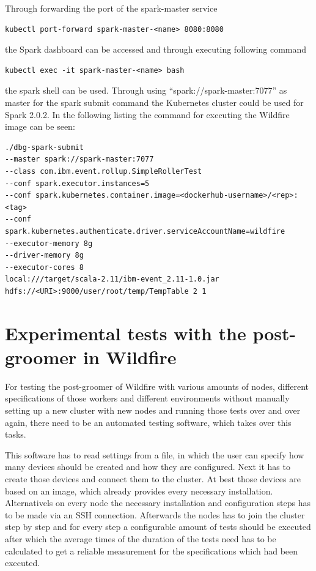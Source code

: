 Through forwarding the port of the spark-master service 
\begin{lstlisting}[caption={Forward spark-master service pod},captionpos=b]
kubectl port-forward spark-master-<name> 8080:8080
\end{lstlisting}
the Spark dashboard can be accessed and through executing following command
\begin{lstlisting}[caption={Access spark shell},captionpos=b]
kubectl exec -it spark-master-<name> bash
\end{lstlisting}
the spark shell can be used. Through using ``spark://spark-master:7077'' as master for the spark submit command the Kubernetes cluster could be used for Spark 2.0.2. In the following listing the command for executing the Wildfire image can be seen:
\begin{lstlisting}[caption={Execute Wildfire image with Kubernetes},captionpos=b]
./dbg-spark-submit 
--master spark://spark-master:7077 
--class com.ibm.event.rollup.SimpleRollerTest 
--conf spark.executor.instances=5 
--conf spark.kubernetes.container.image=<dockerhub-username>/<rep>:<tag> 
--conf spark.kubernetes.authenticate.driver.serviceAccountName=wildfire 
--executor-memory 8g 
--driver-memory 8g 
--executor-cores 8 
local:///target/scala-2.11/ibm-event_2.11-1.0.jar 
hdfs://<URI>:9000/user/root/temp/TempTable 2 1
\end{lstlisting}

\section{Experimental tests with the post-groomer in Wildfire}

For testing the post-groomer of Wildfire with various amounts of nodes, different specifications of those workers and different environments without manually setting up a new cluster with new nodes and running those tests over and over again, there need to be an automated testing software, which takes over this tasks. 

This software has to read settings from a file, in which the user can specify how many devices should be created and how they are configured. Next it has to create those devices and connect them to the cluster. At best those devices are based on an image, which already provides every necessary installation. Alternativels on every node the necessary installation and configuration steps has to be made via an SSH connection. Afterwards the nodes has to join the cluster step by step and for every step a configurable amount of tests should be executed after which the average times of the duration of the tests need has to be calculated to get a reliable measurement for the specifications which had been executed.

